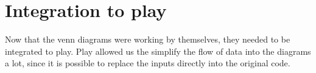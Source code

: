 \section{Integration to play}
Now that the venn diagrams were working by themselves, they needed to be integrated to play. Play allowed us the simplify the flow of data into the diagrams a lot, since it is possible to replace the inputs directly into the original code.